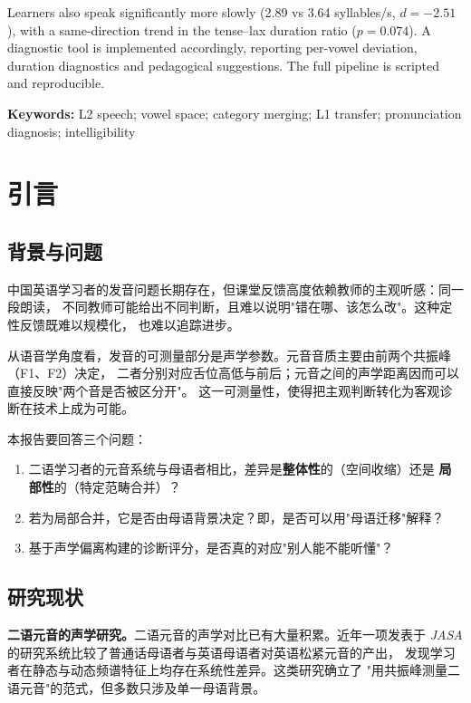 \documentclass[12pt,a4paper,fontset=fandol]{ctexrep}
\begin{document}
Learners also speak significantly more slowly (2.89 vs 3.64 syllables/s, $d=-2.51$), with a
same-direction trend in the tense--lax duration ratio ($p=0.074$). A diagnostic tool is
implemented accordingly, reporting per-vowel deviation, duration diagnostics and pedagogical
suggestions. The full pipeline is scripted and reproducible.

\vspace{0.5em}
\noindent\textbf{Keywords:} L2 speech; vowel space; category merging; L1 transfer;
pronunciation diagnosis; intelligibility

\tableofcontents
\newpage

\chapter{引言}

\section{背景与问题}

中国英语学习者的发音问题长期存在，但课堂反馈高度依赖教师的主观听感：同一段朗读，
不同教师可能给出不同判断，且难以说明"错在哪、该怎么改"。这种定性反馈既难以规模化，
也难以追踪进步。

从语音学角度看，发音的可测量部分是声学参数。元音音质主要由前两个共振峰（F1、F2）决定，
二者分别对应舌位高低与前后；元音之间的声学距离因而可以直接反映"两个音是否被区分开"。
这一可测量性，使得把主观判断转化为客观诊断在技术上成为可能。

本报告要回答三个问题：

\begin{enumerate}[leftmargin=2em,itemsep=2pt]
  \item 二语学习者的元音系统与母语者相比，差异是\textbf{整体性}的（空间收缩）还是
        \textbf{局部性}的（特定范畴合并）？
  \item 若为局部合并，它是否由母语背景决定？即，是否可以用"母语迁移"解释？
  \item 基于声学偏离构建的诊断评分，是否真的对应"别人能不能听懂"？
\end{enumerate}

\section{研究现状}

\textbf{二语元音的声学研究。}二语元音的声学对比已有大量积累。近年一项发表于
\textit{JASA} 的研究系统比较了普通话母语者与英语母语者对英语松紧元音的产出，
发现学习者在静态与动态频谱特征上均存在系统性差异\cite{jasa2024}。这类研究确立了
"用共振峰测量二语元音"的范式，但多数只涉及单一母语背景。
\end{document}
